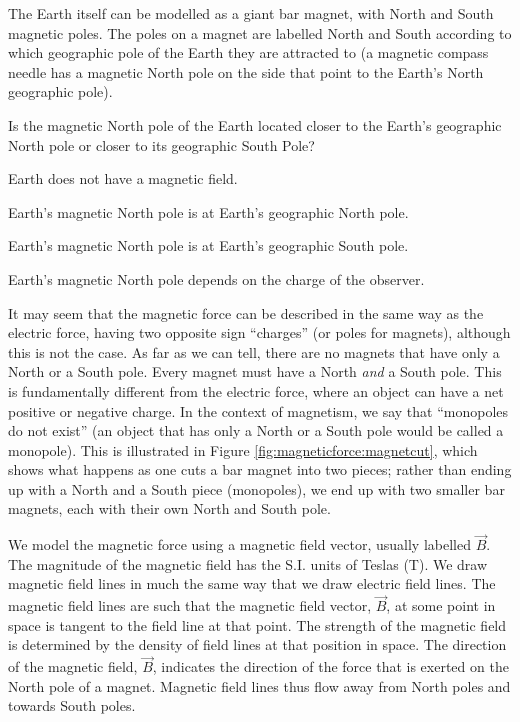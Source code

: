 The Earth itself can be modelled as a giant bar magnet, with North and South magnetic poles. The poles on a magnet are labelled North and South according to which geographic pole of the Earth they are attracted to (a magnetic compass needle has a magnetic North pole on the side that point to the Earth's North geographic pole).
\begin{checkpoint}{}
	\begin{MCquestion}{Is the magnetic North pole of the Earth located closer to the Earth's geographic North pole or closer to its geographic South Pole?}
		\item Earth does not have a magnetic field.
		\item Earth's magnetic North pole is at Earth's geographic North pole.
		\item Earth's magnetic North pole is at Earth's geographic South pole. \correct
		\item Earth's magnetic North pole depends on the charge of the observer.
	\end{MCquestion}
\end{checkpoint}

It may seem that the magnetic force can be described in the same way as the electric force, having two opposite sign ``charges'' (or poles for magnets), although this is not the case. As far as we can tell, there are no magnets that have only a North or a South pole. Every magnet must have a North \textit{and} a South pole. This is fundamentally different from the electric force, where an object can have a net positive or negative charge. In the context of magnetism, we say that ``monopoles do not exist'' (an object that has only a North or a South pole would be called a monopole). This is illustrated in Figure \ref{fig:magneticforce:magnetcut}, which shows what happens as one cuts a bar magnet into two pieces; rather than ending up with a North and a South piece (monopoles), we end up with two smaller bar magnets, each with their own North and South pole.


We model the magnetic force using a magnetic field vector, usually labelled $\vec B$. The magnitude of the magnetic field has the S.I. units of Teslas (\si{T}). We draw magnetic field lines in much the same way that we draw electric field lines. The magnetic field lines are such that the magnetic field vector, $\vec B$, at some point in space is tangent to the field line at that point. The strength of the magnetic field is determined by the density of field lines at that position in space. The direction of the magnetic field, $\vec B$, indicates the direction of the force that is exerted on the North pole of a magnet. Magnetic field lines thus flow away from North poles and towards South poles. 

